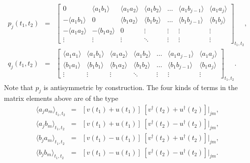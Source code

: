 \documentclass[a4paper,10pt]{article}
\begin{document}
\begin{eqnarray}
p_j(t_1,t_2)  &=& \begin{bmatrix}
                  0 & \langle a_1b_1\rangle & \langle a_1 a_2\rangle & \langle a_1 b_2\rangle & \dots & \langle a_1 b_{j-1}\rangle & \langle a_1 a_j\rangle\\
                   -\langle a_1 b_1\rangle  &        0              & \langle b_1 a_2\rangle & \langle b_1 b_2 \rangle & \dots & \langle b_1 b_{j-1}\rangle & \langle b_1 b_j\rangle \\ 
                    -\langle a_1 a_2\rangle   &  -\langle b_1 a_2\rangle   & 0 & \vdots & \vdots & \vdots & \vdots \\
                    \vdots                    &   \vdots                    & \vdots    & \ddots &\vdots & \vdots & \vdots
                 \end{bmatrix}_{t_1,t_2} ,\nonumber \\
q_j(t_1,t_2)  &=& \begin{bmatrix}
                   \langle a_1 a_1\rangle & \langle a_1b_1\rangle & \langle a_1a_2\rangle & \langle a_1b_2\rangle & \dots & \langle a_1a_{j-1}\rangle & \langle a_1a_j\rangle \\
                   \langle b_1 a_1\rangle & \langle b_1 b_1\rangle & \langle b_1 a_2\rangle & \langle b_1 b_2\rangle & \dots & \langle b_1 b_{j-1}\rangle & \langle b_1 a_j\rangle\\
                    \vdots                    &   \vdots                    & \vdots    & \ddots &\vdots & \vdots & \vdots
                  \end{bmatrix}_{t_1,t_2}.
\end{eqnarray}
Note that $p_j$ is antisymmetric by construction. The four kinds of terms in the matrix elements above are of the type
\begin{eqnarray}
\langle a_j a_m \rangle_{t_1,t_2} & = & \left[v(t_1)+u(t_1)\right]\;\left[v^\dagger(t_2)+u^\dagger(t_2)\right]\bigg|_{jm},\nonumber \\
\langle a_j b_m \rangle_{t_1,t_2} & = & \left[v(t_1)+u(t_1)\right]\;\left[v^\dagger(t_2)-u^\dagger(t_2)\right]\bigg|_{jm},\nonumber \\
\langle b_j a_m \rangle_{t_1,t_2} & = & \left[v(t_1)-u(t_1)\right]\;\left[v^\dagger(t_2)+u^\dagger(t_2)\right]\bigg|_{jm},\nonumber \\
\langle b_j b_m \rangle_{t_1,t_2} & = & \left[v(t_1)-u(t_1)\right]\;\left[v^\dagger(t_2)-u^\dagger(t_2)\right]\bigg|_{jm}.
\end{eqnarray}
\end{document}
